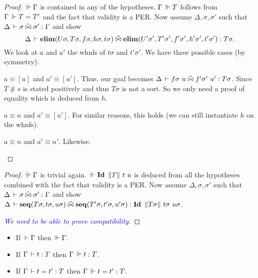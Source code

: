 \documentclass[a4paper,english]{lipics-utf8x}
\newcommand\meta[1]{\noindent\textcolor{blue}{\emph{#1}}}
\begin{document}
  \begin{proof}
    $\,\Vdash \Gamma$ is contained in any of the hypotheses.
    $\Gamma \,\Vdash T$ follows from $\Gamma \,\Vdash T = T'$ and the fact that validity
    is a PER.
    Now assume $\Delta, \sigma, \sigma'$ such that
    $\Delta \,\vdash \sigma \mathrel{\widehat{\bowtie}} \sigma' : \Gamma$ and
    show
    \[\Delta \,\vdash \operatorname{\mathbf{elim}}(U \sigma,T \sigma,f \sigma,h \sigma,t \sigma) \mathrel{\widehat{\bowtie}}
    \operatorname{\mathbf{elim}}(U' \sigma',T' \sigma',f' \sigma',h' \sigma',t' \sigma') : T \sigma.\]
    We look at $a$ and $a'$ the whnfs of $t \sigma$ and $t' \sigma'$.
    We have three possible cases (by symmetry):
    \begin{caselist}
      \nextcase $a \equiv [u]$ and $a' \equiv [u']$.
      Thus, our goal becomes
      $\Delta \der f \sigma\ u \hEr f' \sigma'\ u' : T \sigma$.
      Since $T \nequiv s$ is stated positively and thus $T \sigma$ is not a
      sort. So we only need a proof of equality which is deduced from $h$.

      \nextcase $a \equiv n$ and $a' \equiv [u']$.
      For similar reasons, this holds (we can still instantiate $h$ on the
      whnfs).

      \nextcase $a \equiv n$ and $a' \equiv n'$.
      Likewise.
    \end{caselist}
  \end{proof}

  \begin{lemma}
    \leavevmode
    \begin{mathc}
    \end{mathc}
  \end{lemma}

  \begin{proof}
    $\,\Vdash \Gamma$ is trivial again.
    $\Der \Id \squash{T}\ t\ u$ is deduced from all the hypotheses combined
    with the fact that validity is a PER.
    Now assume $\Delta, \sigma, \sigma'$ such that
    $\Delta \,\vdash \sigma \mathrel{\widehat{\bowtie}} \sigma' : \Gamma$ and
    show
    $\Delta \der \seq(T\sigma,t\sigma,u\sigma) \hEr
    \seq(T'\sigma,t'\sigma,u'\sigma) : \Id \squash{T\sigma}\ t\sigma\ u\sigma$.

    \meta{We need to be able to prove compatibility.}
  \end{proof}

  \begin{theorem}
    \leavevmode
    \begin{itemize}
      \item If $\,\vdash \Gamma$ then $\,\Vdash \Gamma$.
      \item If $\Gamma \,\vdash t : T$ then $\Gamma \,\Vdash t : T$.
      \item If $\Gamma \,\vdash t = t' : T$ then $\Gamma \,\Vdash t = t' : T$.
    \end{itemize}
  \end{theorem}
\end{document}
